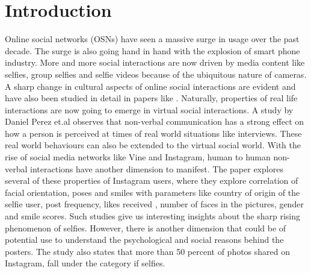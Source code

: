 \section{Introduction}
Online social networks (OSNs) have seen a massive surge in usage over the past decade. The surge is also going hand in hand with the explosion of smart phone industry. More and more social interactions are now driven by media content like selfies, group selfies and selfie videos because of the ubiquitous nature of cameras. A sharp change in cultural aspects of online social interactions are evident and have also been studied in detail in papers like \cite{Souza2015}. Naturally, properties of real life interactions are now going to emerge in virtual social interactions. A study by Daniel Perez et.al \cite{7175072} observes that non-verbal communication has a strong effect on how a person is perceived at times of real world situations like interviews. These real world behaviours can also be extended to the virtual social world. With the rise of social media networks like Vine and Instagram, human to human non-verbal interactions have another dimension to manifest. 
The \cite{Souza2015} paper explores several of these properties of Instagram users, where they explore correlation of facial orientation, poses and smiles with parameters like country of origin of the selfie user, post frequency, likes received , number of faces in the pictures, gender and smile scores. Such studies give us interesting insights about the sharp rising phenomenon of selfies. However, there is another dimension that could be of potential use to understand the psychological and social reasons behind the posters. The study also states that more than 50 percent of photos shared on Instagram, fall under the category if selfies. 